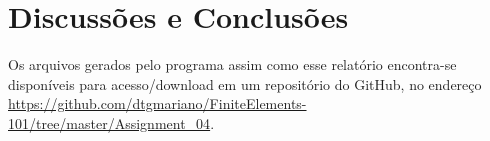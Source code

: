 \section{Discussões e Conclusões}
Os arquivos gerados pelo programa assim como esse relatório encontra-se disponíveis para acesso/download em um repositório do GitHub, no endereço \url{https://github.com/dtgmariano/FiniteElements-101/tree/master/Assignment_04}.
